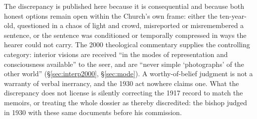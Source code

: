 The discrepancy is published here because it is consequential and
because both honest options remain open within the Church's own
frame: either the ten-year-old, questioned in a chaos of light and
crowd, misreported or misremembered a sentence, or the sentence was
conditioned or temporally compressed in ways the hearer could not
carry. The 2000 theological commentary supplies the controlling
category: interior visions are received ``in the modes of
representation and consciousness available'' to the seer, and are
``never simple `photographs' of the other world''
(\S\ref{sec:interp2000}, \S\ref{sec:mode}).  A
worthy-of-belief judgment is not a warranty of verbal inerrancy, and
the 1930 act nowhere claims one. What the discrepancy does not
license is silently correcting the 1917 record to match the memoirs,
or treating the whole dossier as thereby discredited: the bishop
judged in 1930 with these same documents before his commission.
